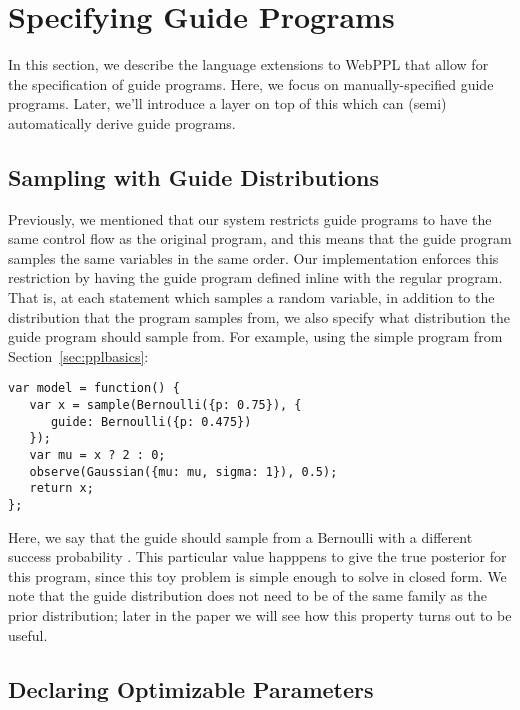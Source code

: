 \section{Specifying Guide Programs}
\label{sec:guideSpec}

In this section, we describe the language extensions to WebPPL that allow for the specification of guide programs.
Here, we focus on manually-specified guide programs. Later, we'll introduce a layer on top of this which can (semi) automatically derive guide programs.

\subsection{Sampling with Guide Distributions}

Previously, we mentioned that our system restricts guide programs to have the same control flow as the original program, and this means that the guide program samples the same variables in the same order.
Our implementation enforces this restriction by having the guide program defined inline with the regular program.
That is, at each  statement which samples a random variable, in addition to the distribution that the program samples from, we also specify what distribution the guide program should sample from. For example, using the simple program from Section~\ref{sec:pplbasics}:
\begin{lstlisting}
var model = function() {
   var x = sample(Bernoulli({p: 0.75}), {
      guide: Bernoulli({p: 0.475})
   });
   var mu = x ? 2 : 0;
   observe(Gaussian({mu: mu, sigma: 1}), 0.5);
   return x;
};
\end{lstlisting}
Here, we say that the guide should sample from a Bernoulli with a different success probability . This particular value happpens to give the true posterior for this program, since this toy problem is simple enough to solve in closed form.
We note that the guide distribution does not need to be of the same family as the prior distribution; later in the paper we will see how this property turns out to be useful.

\subsection{Declaring Optimizable Parameters}

